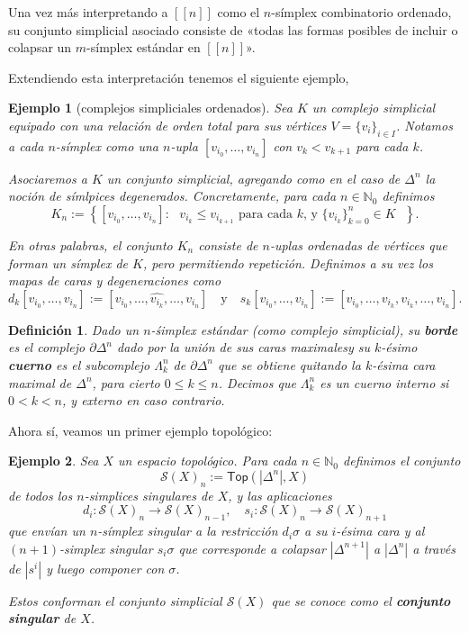 \documentclass[11pt]{report}
\theoremstyle{colored}
\newtheorem{definition}{Definición}[section]
\newtheorem{example}{Ejemplo}[section]
\newcommand{\N}{\mathbb{N}}
\newcommand{\nat}[1]{[\![#1]\!]}
\newcommand{\ord}[1]{\nat{#1}}
\newcommand{\cat}[1]{\mathsf{#1}}
\renewcommand{\ss}[1]{\Delta^{#1}}
\newcommand{\bss}[1]{\partial \ss{n}}
\newcommand{\horn}[2]{\Lambda^{#1}_{#2}}
\begin{document}
Una vez más interpretando a $\ord{n}$ como el $n$-símplex combinatorio ordenado, su conjunto simplicial asociado consiste de «todas las formas posibles de incluir o colapsar un $m$-símplex estándar en $\nat{n}$».

Extendiendo esta interpretación tenemos el siguiente ejemplo,

\begin{example}[complejos simpliciales ordenados] Sea $K$ un complejo simplicial equipado con una relación de orden total para sus vértices $V = \{v_i\}_{i \in I}$. Notamos a cada $n$-símplex como una $n$-upla $[v_{i_0},\dots, v_{i_n}]$ con $v_k < v_{k+1}$ para cada $k$.

Asociaremos a $K$ un conjunto simplicial, agregando como en el caso de $\ss{n}$ la noción de \textit{símlpices degenerados}. Concretamente, para cada $n \in \N_0$ definimos
\[
K_n := \left\{[v_{i_0}, \dots, v_{i_n}] : \text{ $v_{i_k} \leq v_{i_{k+1}}$ para cada $k$, y $\{v_{i_k}\}_{k = 0}^n \in K$ }\right\}.
\]

En otras palabras, el conjunto $K_n$ consiste de $n$-uplas ordenadas de vértices que forman un símplex de $K$, pero permitiendo repetición. Definimos a su vez los mapas de caras y degeneraciones como
\[
d_k[v_{i_0}, \dots, v_{i_n}] := [v_{i_0},\dots,\widehat{v_{i_k}},\dots, v_{i_n}] \quad \text{y} \quad
s_k[v_{i_0}, \dots, v_{i_n}] := [v_{i_0},\dots,v_{i_k},v_{i_k}, \dots, v_{i_n}].
\]
\end{example}

\begin{definition} Dado un $n$-śimplex estándar (como complejo simplicial), su \textbf{borde} es el complejo $\bss{n}$ dado por la unión de sus caras maximalesy su $k$-ésimo \textbf{cuerno} es el subcomplejo $\horn{n}{k}$ de $\bss{n}$ que se obtiene quitando la $k$-ésima cara maximal de $\ss{n}$, para cierto $0 \leq k \leq n$. Decimos que $\horn{n}{k}$ es un cuerno \textit{interno} si $0 < k < n$, y \textit{externo} en caso contrario.
\end{definition}

Ahora sí, veamos un primer ejemplo topológico:

\begin{example} Sea $X$ un espacio topológico. Para cada $n \in \N_0$ definimos el conjunto
\[
\mathcal{S}(X)_n := \cat{Top}(|\ss{n}|,X)
\]
de todos los $n$-simplices singulares de $X$, y las aplicaciones 
\[
d_i : \mathcal{S}(X)_n \to \mathcal{S}(X)_{n-1}, \quad
s_i : \mathcal{S}(X)_n \to \mathcal{S}(X)_{n+1}
\]
que envían un $n$-símplex singular a la restricción $d_i\sigma$ a su $i$-ésima cara y al $(n+1)$-simplex singular $s_i\sigma$ que corresponde a colapsar $|\ss{n+1}|$ a $|\ss{n}|$ a través de $|s^i|$ y luego componer con $\sigma$.

Estos conforman el conjunto simplicial $\mathcal{S}(X)$ que se conoce como el \textbf{conjunto singular} de $X$.
\end{example}
\end{document}
